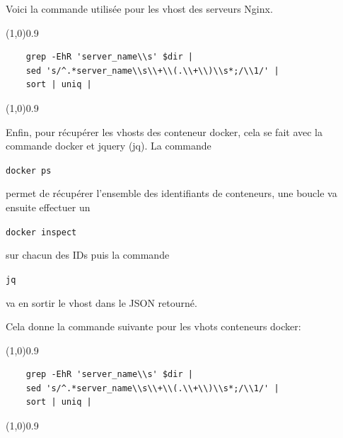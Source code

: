 \documentclass[12pt]{article}
\begin{document}
Voici la commande utilisée pour les vhost des serveurs Nginx.
\vspace{-1ex}
\begin{code}
\vspace{-1ex}
\begin{center} 
    \line(1,0){0.9\textwidth} 
\end{center}
\vspace{-1ex}
\begin{verbatim}
    grep -EhR 'server_name\\s' $dir | 
    sed 's/^.*server_name\\s\\+\\(.\\+\\)\\s*;/\\1/' |
    sort | uniq |
\end{verbatim}
    \vspace{-1ex}
\begin{center} 
    \line(1,0){0.9\textwidth} 
\end{center}
\end{code}


Enfin, pour récupérer les vhosts des conteneur docker, cela se fait avec la commande docker et jquery (jq).
La commande \begin{code} \texttt{docker ps}\end{code} permet de récupérer l'ensemble des identifiants de conteneurs, une boucle va ensuite effectuer un \begin{code} \texttt{docker inspect}\end{code} sur chacun des IDs puis la commande \begin{code} \texttt{jq}\end{code}  va en sortir le vhost dans le JSON retourné.

Cela donne la commande suivante pour les vhots conteneurs docker:
\vspace{-1ex}
\begin{code}
\vspace{-1ex}
\begin{center} 
    \line(1,0){0.9\textwidth} 
\end{center}
\vspace{-1ex}
\begin{verbatim}
    grep -EhR 'server_name\\s' $dir | 
    sed 's/^.*server_name\\s\\+\\(.\\+\\)\\s*;/\\1/' |
    sort | uniq |
\end{verbatim}
\vspace{-1ex}
\begin{center} 
    \line(1,0){0.9\textwidth} 
\end{center}
\end{code}
\end{document}
